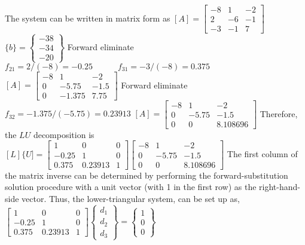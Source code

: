 \documentclass[../main.tex]{subfiles}
\begin{document}
The system can be written in matrix form as
\bigbreak
$[A]=\left[\begin{array}{ccc}-8 & 1 & -2 \\ 2 & -6 & -1 \\ -3 & -1 & 7\end{array}\right]$\quad\quad
$\{b\}=\left\{\begin{array}{l}-38 \\ -34 \\ -20\end{array}\right\}$
\bigbreak
Forward eliminate
\bigbreak
$f_{21}=2 /(-8)=-0.25 \quad \quad \quad f_{31}=-3 /(-8)=0.375$
\bigbreak
$[A]=\left[\begin{array}{ccc}-8 & 1 & -2 \\ 0 & -5.75 & -1.5 \\ 0 & -1.375 & 7.75\end{array}\right]$
\bigbreak
Forward eliminate
\bigbreak
$f_{32}=-1.375 /(-5.75)=0.23913$
\bigbreak
$[A]=\left[\begin{array}{ccc}-8 & 1 & -2 \\ 0 & -5.75 & -1.5 \\ 0 & 0 & 8.108696\end{array}\right]$
\bigbreak
Therefore, the $L U$ decomposition is
\bigbreak
$[L]\{U]=\left[\begin{array}{ccc}1 & 0 & 0 \\ -0.25 & 1 & 0 \\ 0.375 & 0.23913 & 1\end{array}\right]\left[\begin{array}{ccc}-8 & 1 & -2 \\ 0 & -5.75 & -1.5 \\ 0 & 0 & 8.108696\end{array}\right]$
\bigbreak
The first column of the matrix inverse can be determined by performing the forward-\smallbreak substitution solution procedure with a unit vector (with 1 in the first row) as the right-hand-\smallbreak side vector. Thus, the lower-triangular system, can be set up as,
\bigbreak
$\left[\begin{array}{ccc}1 & 0 & 0 \\ -0.25 & 1 & 0 \\ 0.375 & 0.23913 & 1\end{array}\right]\left\{\begin{array}{l}d_{1} \\ d_{2} \\ d_{3}\end{array}\right\}=\left\{\begin{array}{l}1 \\ 0 \\ 0\end{array}\right\}$
\end{document}
